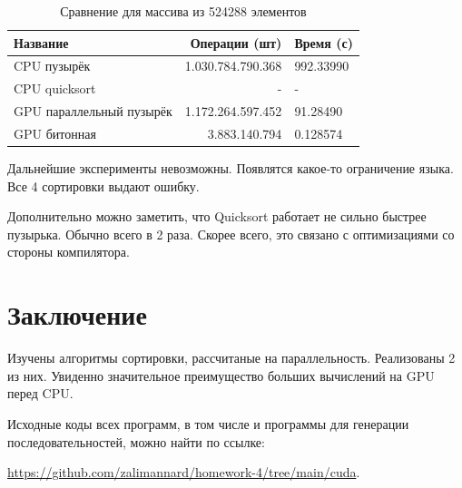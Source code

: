 \documentclass[a4paper,article]{article}
\begin{document}
    \begin{table}[h!]
        \centering
        \begin{tabular}{| l | r | l |}
            \hline
            {Название} & Операции (шт) & Время (с) \\
            \hline
            CPU пузырёк & 1.030.784.790.368 & 992.33990 \\
            \hline
            CPU quicksort & - & - \\
            \hline
            GPU параллельный пузырёк & 1.172.264.597.452 & 91.28490 \\
            \hline
            GPU битонная & 3.883.140.794 & 0.128574 \\
            \hline
        \end{tabular}
        \caption{Сравнение для массива из 524288 элементов}
        \label{table:comparsion524288}
    \end{table}

    Дальнейшие эксперименты невозможны. Появлятся какое-то ограничение языка. Все 4 сортировки выдают ошибку.

    Дополнительно можно заметить, что Quicksort работает не сильно быстрее пузырька. Обычно всего в 2 раза. Скорее всего, это связано с оптимизациями со стороны компилятора.

    \newpage

    \section*{Заключение}

    Изучены алгоритмы сортировки, рассчитаные на параллельность. Реализованы 2 из них. Увиденно значительное преимущество больших вычислений на GPU перед CPU.


    Исходные коды всех программ, в том числе и программы для генерации последовательностей, можно найти по ссылке:

    \url{https://github.com/zalimannard/homework-4/tree/main/cuda}.
\end{document}
